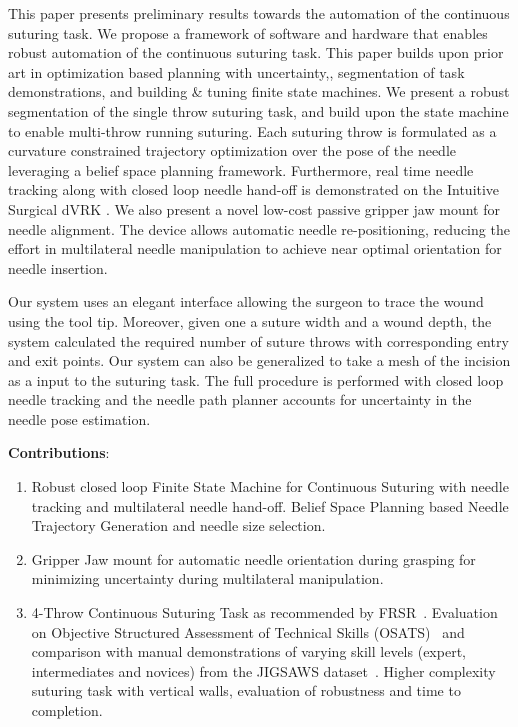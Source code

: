 \documentclass[0-suturing.tex]{subfiles}
\begin{document}
This paper presents preliminary results towards the automation of the continuous suturing task. We propose a framework of software and hardware that enables robust automation of the continuous suturing task. 
This paper builds upon prior art in optimization based planning with uncertainty\cite{patil2014gaussian},, segmentation of task demonstrations\cite{krishnan2015tsc, lea2015improved}, and building \& tuning finite state machines\cite{Murali2015Learning}. We present a robust segmentation of the single throw suturing task, and build upon the state machine to enable multi-throw running suturing. Each suturing throw is formulated as a curvature constrained trajectory optimization over the pose of the needle leveraging a belief space planning framework. Furthermore, real time needle tracking along with closed loop needle hand-off is demonstrated on the Intuitive Surgical dVRK \cite{Kazanzides2014}. We also present a novel low-cost passive gripper jaw mount for needle alignment. The device allows automatic needle re-positioning, reducing the effort in multilateral needle manipulation to achieve near optimal orientation for needle insertion.

Our system uses an elegant interface allowing the surgeon to trace the wound using the tool tip. Moreover, given one a suture width and a wound depth, the system calculated the required number of suture throws with corresponding entry and exit points. Our system can also be generalized to take a mesh of the incision as a input to the suturing task. The full procedure is performed with closed loop needle tracking and the needle path planner accounts for uncertainty in the needle pose estimation.

\vspace{5pt}
\noindent \textbf{Contributions}:
\begin{enumerate}[noitemsep, leftmargin=*]
\item Robust closed loop Finite State Machine for Continuous Suturing with needle tracking and multilateral needle hand-off. Belief Space Planning based Needle Trajectory Generation and needle size selection.
\item Gripper Jaw mount for automatic needle orientation during grasping for minimizing uncertainty during multilateral manipulation.
\item 4-Throw Continuous Suturing Task as recommended by FRSR~\cite{stegemann2013fundamental}. Evaluation on Objective Structured Assessment of Technical Skills (OSATS)~\cite{schreuder2012training} and comparison with manual demonstrations of varying skill levels (expert, intermediates and novices) from the JIGSAWS dataset~\cite{gao2014jhu}. Higher complexity suturing task with vertical walls, evaluation of robustness and time to completion.
\end{enumerate}
\end{document}

